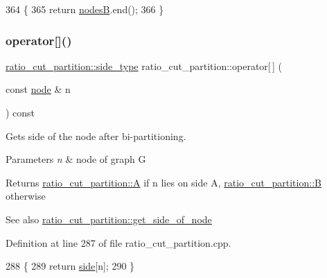 \begin{DoxyCode}
364 \{
365     \textcolor{keywordflow}{return} \mbox{\hyperlink{classratio__cut__partition_af207198b35e52e4055487f8ae8c23d8d}{nodesB}}.end();
366 \}
\end{DoxyCode}
\mbox{\label{classratio__cut__partition_a47358935eb416c38969b66fbf3f095b5}} 
\subsubsection{\texorpdfstring{operator[]()}{operator[]()}}
{\footnotesize\ttfamily \mbox{\hyperlink{classratio__cut__partition_ace53442bd0c1e21fbf00858ec6f6b456}{ratio\+\_\+cut\+\_\+partition\+::side\+\_\+type}} ratio\+\_\+cut\+\_\+partition\+::operator\mbox{[}$\,$\mbox{]} (\begin{DoxyParamCaption}\item[{const \mbox{\hyperlink{classnode}{node}} \&}]{n }\end{DoxyParamCaption}) const}

Gets side of the node after bi-\/partitioning.


\begin{DoxyParams}{Parameters}
{\em n} & node of graph G \\
\hline
\end{DoxyParams}
\begin{DoxyReturn}{Returns}
{\ttfamily \mbox{\hyperlink{classratio__cut__partition_a9c0da5ad845b01bddbc1f238fa35cdd0}{ratio\+\_\+cut\+\_\+partition\+::A}}} if {\ttfamily n} lies on side {\ttfamily A}, {\ttfamily \mbox{\hyperlink{classratio__cut__partition_adf075987228d8adc7950d5b1ba332daa}{ratio\+\_\+cut\+\_\+partition\+::B}}} otherwise 
\end{DoxyReturn}
\begin{DoxySeeAlso}{See also}
\mbox{\hyperlink{classratio__cut__partition_a3b0a7dcc26c9ca25016abf2cebf250fe}{ratio\+\_\+cut\+\_\+partition\+::get\+\_\+side\+\_\+of\+\_\+node}} 
\end{DoxySeeAlso}


Definition at line 287 of file ratio\+\_\+cut\+\_\+partition.\+cpp.


\begin{DoxyCode}
288 \{
289     \textcolor{keywordflow}{return} \mbox{\hyperlink{classratio__cut__partition_a2bf913d1d8607747885177a3b585e611}{side}}[n];
290 \}
\end{DoxyCode}
\mbox{\label{classratio__cut__partition_a3933d3829218a58cfc8eef84981034a8}} 
